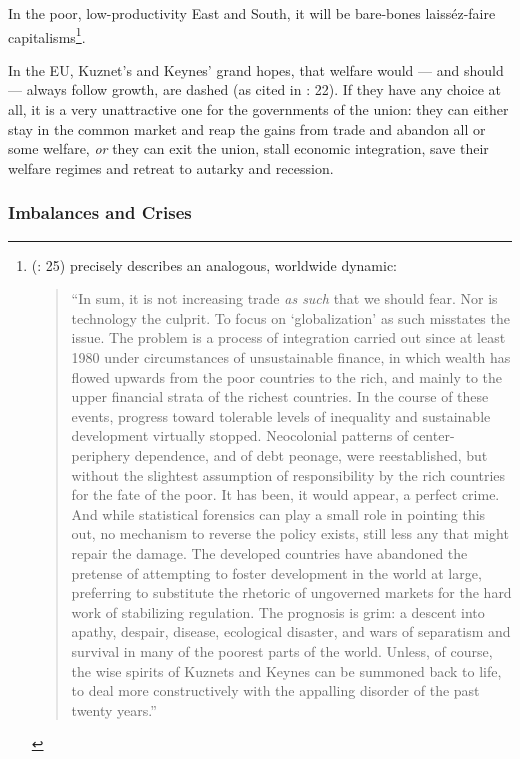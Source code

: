 \documentclass[11pt,a4paper,oneside,openright]{article}
\begin{document}
In the poor, low-productivity East and South, it will be bare-bones laiss\'{e}z-faire capitalisms\footnote{
	\citeauthor{Galbraith2002a} (\citeyear{Galbraith2002a}: 25) precisely describes an analogous, worldwide dynamic:
	\begin{quote}
		``In sum, it is not increasing trade \emph{as such} that we should fear. 
		Nor is technology the culprit. 
		To focus on `globalization' as such misstates the issue. 
		The problem is a process of integration carried out since at least 1980 under circumstances of unsustainable finance, in which wealth has flowed upwards from the poor countries to the rich, and mainly to the upper financial strata of the richest countries. 
		In the course of these events, progress toward tolerable levels of inequality and sustainable development virtually stopped. 
		Neocolonial patterns of center-periphery dependence, and of debt peonage, were reestablished, but without the slightest assumption of responsibility by the rich countries for the fate of the poor. 
		It has been, it would appear, a perfect crime. 
		And while statistical forensics can play a small role in pointing this out, no mechanism to reverse the policy exists, still less any that might repair the damage. 
		The developed countries have abandoned the pretense of attempting to foster development in the world at large, preferring to substitute the rhetoric of ungoverned markets for the hard work of stabilizing regulation. 
		The prognosis is grim: 
		a descent into apathy, despair, disease, ecological disaster, and wars of separatism and survival in many of the poorest parts of the world. 
		Unless, of course, the wise spirits of Kuznets and Keynes can be summoned back to life, to deal more constructively with the appalling disorder of the past twenty years.''
	\end{quote}}.

In the \gls{EU}, Kuznet's and Keynes' grand hopes, that welfare would --- and should --- always follow growth, are dashed (as cited in \citealt{Galbraith2002a}: 22). 
If they have any choice at all, it is a very unattractive one for the governments of the union:
they can either stay in the common market and reap the gains from trade and abandon all or some welfare, \emph{or} they can exit the union, stall economic integration, save their welfare regimes and retreat to autarky and recession.

\subsubsection{Imbalances and Crises} 
\end{document}
